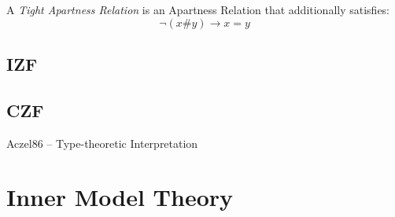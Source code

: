 A \emph{Tight Apartness Relation} is an Apartness Relation that
additionally satisfies:
\[
  \neg (x \# y) \rightarrow x = y
\]



\subsection{IZF}\label{sec:izf}

\subsection{CZF}\label{sec:czf}

Aczel86 -- Type-theoretic Interpretation



\section{Inner Model Theory}\label{sec:inner_model_theory}
